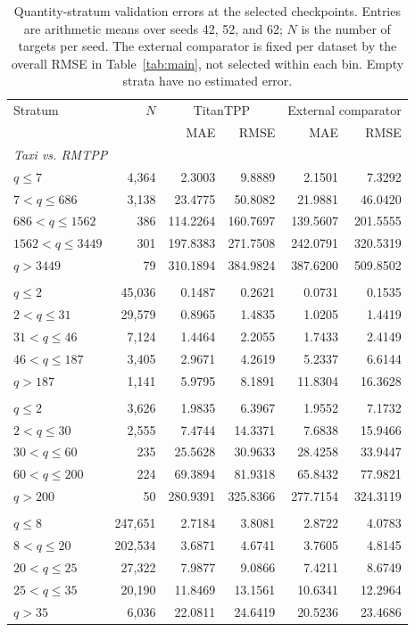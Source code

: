 \documentclass[runningheads]{llncs}
\begin{document}
\begin{table}[p]
\caption{Quantity-stratum validation errors at the selected checkpoints. Entries are arithmetic means over seeds 42, 52, and 62; $N$ is the number of targets per seed. The external comparator is fixed per dataset by the overall RMSE in Table~\ref{tab:main}, not selected within each bin. Empty strata have no estimated error.}
\label{tab:strata-quantity}\centering\scriptsize
\setlength{\tabcolsep}{4pt}
\begin{tabular}{lrrrrr}
\toprule
Stratum & $N$ & \multicolumn{2}{c}{TitanTPP} & \multicolumn{2}{c}{External comparator}\\
 & & MAE & RMSE & MAE & RMSE\\
\midrule
\multicolumn{6}{l}{\textit{Taxi vs. RMTPP}}\\
$q\le 7$ & 4,364 & 2.3003 & 9.8889 & 2.1501 & 7.3292\\
$7<q\le 686$ & 3,138 & 23.4775 & 50.8082 & 21.9881 & 46.0420\\
$686<q\le 1562$ & 386 & 114.2264 & 160.7697 & 139.5607 & 201.5555\\
$1562<q\le 3449$ & 301 & 197.8383 & 271.7508 & 242.0791 & 320.5319\\
$q> 3449$ & 79 & 310.1894 & 384.9824 & 387.6200 & 509.8502\\
\addlinespace
\multicolumn{6}{l}{\textit{Intermittent vs. RMTPP}}\\
$q\le 2$ & 45,036 & 0.1487 & 0.2621 & 0.0731 & 0.1535\\
$2<q\le 31$ & 29,579 & 0.8965 & 1.4835 & 1.0205 & 1.4419\\
$31<q\le 46$ & 7,124 & 1.4464 & 2.2055 & 1.7433 & 2.4149\\
$46<q\le 187$ & 3,405 & 2.9671 & 4.2619 & 5.2337 & 6.6144\\
$q> 187$ & 1,141 & 5.9795 & 8.1891 & 11.8304 & 16.3628\\
\addlinespace
\multicolumn{6}{l}{\textit{RAF vs. S2P2}}\\
$q\le 2$ & 3,626 & 1.9835 & 6.3967 & 1.9552 & 7.1732\\
$2<q\le 30$ & 2,555 & 7.4744 & 14.3371 & 7.6838 & 15.9466\\
$30<q\le 60$ & 235 & 25.5628 & 30.9633 & 28.4258 & 33.9447\\
$60<q\le 200$ & 224 & 69.3894 & 81.9318 & 65.8432 & 77.9821\\
$q> 200$ & 50 & 280.9391 & 325.8366 & 277.7154 & 324.3119\\
\addlinespace
\multicolumn{6}{l}{\textit{Instacart vs. S2P2}}\\
$q\le 8$ & 247,651 & 2.7184 & 3.8081 & 2.8722 & 4.0783\\
$8<q\le 20$ & 202,534 & 3.6871 & 4.6741 & 3.7605 & 4.8145\\
$20<q\le 25$ & 27,322 & 7.9877 & 9.0866 & 7.4211 & 8.6749\\
$25<q\le 35$ & 20,190 & 11.8469 & 13.1561 & 10.6341 & 12.2964\\
$q> 35$ & 6,036 & 22.0811 & 24.6419 & 20.5236 & 23.4686\\
\bottomrule
\end{tabular}
\end{table}
\end{document}
